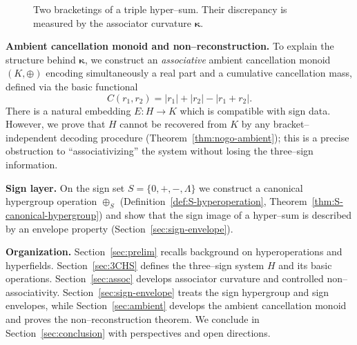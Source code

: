 \documentclass[11pt]{amsart}
\numberwithin{equation}{section}
\theoremstyle{definition}
\theoremstyle{remark}
\newcommand{\Sset}{S}                      %
\newcommand{\AssocCurv}{\boldsymbol{\kappa}} %
\newcommand{\sop}{\oplus_S}                %
\newcommand{\Eemb}{E}                      %
\newcommand{\Cfun}{C}                      %
\begin{document}
\begin{figure}[t]
\centering
{}
\caption{Two bracketings of a triple hyper--sum.  Their discrepancy is measured
by the associator curvature $\AssocCurv$.}
\label{fig:assoc-diagram}
\end{figure}

\medskip
\noindent\textbf{Ambient cancellation monoid and non--reconstruction.}
To explain the structure behind $\AssocCurv$, we construct an \emph{associative}
ambient cancellation monoid $(K,\oplus)$ encoding simultaneously a real part and
a cumulative cancellation mass, defined via the basic functional
\[
\Cfun(r_1,r_2)=|r_1|+|r_2|-|r_1+r_2|.
\]
There is a natural embedding $\Eemb:H\to K$ which is compatible with sign data.
However, we prove that $H$ cannot be recovered from $K$ by any
bracket--independent decoding procedure (Theorem~\ref{thm:nogo-ambient}); this is
a precise obstruction to ``associativizing'' the system without losing the
three--sign information.

\medskip
\noindent\textbf{Sign layer.}
On the sign set $\Sset=\{0,+,-,\Lambda\}$ we construct a canonical hypergroup
operation $\sop$ (Definition~\ref{def:S-hyperoperation},
Theorem~\ref{thm:S-canonical-hypergroup}) and show that the sign image of a
hyper--sum is described by an envelope property
(Section~\ref{sec:sign-envelope}).

\medskip
\noindent\textbf{Organization.}
Section~\ref{sec:prelim} recalls background on hyperoperations and hyperfields.
Section~\ref{sec:3CHS} defines the three--sign system $H$ and its basic
operations.  Section~\ref{sec:assoc} develops associator curvature and controlled
non--associativity.  Section~\ref{sec:sign-envelope} treats the sign hypergroup
and sign envelopes, while Section~\ref{sec:ambient} develops the ambient
cancellation monoid and proves the non--reconstruction theorem.
We conclude in Section~\ref{sec:conclusion} with perspectives and open
directions.
\end{document}
